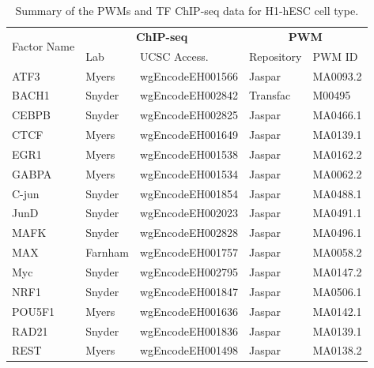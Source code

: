 \documentclass{bioinfo}
\begin{document}
\begin{table}[t]
\begin{center}
\caption{Summary of the PWMs and TF ChIP-seq data for H1-hESC cell type.}
\label{tab:datapwm.h1hesc}
    \renewcommand{\arraystretch}{1.2}
    \begin{tabular}{ l|ll|ll }
        \hline
        \multirow{2}{*}{Factor Name} & \multicolumn{2}{c|}{\textbf{ChIP-seq}} & \multicolumn{2}{c}{\textbf{PWM}} \\
               & Lab     & UCSC Access.     & Repository & PWM ID   \\
        \hline
        ATF3   & Myers   & wgEncodeEH001566 & Jaspar     & MA0093.2 \\
        BACH1  & Snyder  & wgEncodeEH002842 & Transfac   & M00495   \\
        CEBPB  & Snyder  & wgEncodeEH002825 & Jaspar     & MA0466.1 \\
        CTCF   & Myers   & wgEncodeEH001649 & Jaspar     & MA0139.1 \\
        EGR1   & Myers   & wgEncodeEH001538 & Jaspar     & MA0162.2 \\
        GABPA   & Myers   & wgEncodeEH001534 & Jaspar     & MA0062.2 \\
        C-jun    & Snyder  & wgEncodeEH001854 & Jaspar     & MA0488.1 \\
        JunD   & Snyder  & wgEncodeEH002023 & Jaspar     & MA0491.1 \\
        MAFK   & Snyder  & wgEncodeEH002828 & Jaspar     & MA0496.1 \\
        MAX    & Farnham & wgEncodeEH001757 & Jaspar     & MA0058.2 \\
        Myc    & Snyder  & wgEncodeEH002795 & Jaspar     & MA0147.2 \\
        NRF1   & Snyder  & wgEncodeEH001847 & Jaspar     & MA0506.1 \\
        POU5F1 & Myers   & wgEncodeEH001636 & Jaspar     & MA0142.1 \\
        RAD21  & Snyder  & wgEncodeEH001836 & Jaspar     & MA0139.1 \\
        REST   & Myers   & wgEncodeEH001498 & Jaspar     & MA0138.2 \\

\end{tabular}
\end{center}
\end{table}
\end{document}
